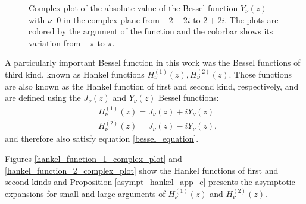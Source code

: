 \begin{figure}[!htb]
\begin{minipage}{.5\textwidth}
        \captionsetup{width=0.9\linewidth} %
        \caption{Complex plot of the absolute value of the Bessel function \(Y_\nu(z)\) with \(\nu_=0\) in the complex plane from \(-2-2i\) to \(2+2i\). The plots are colored by the argument of the function and the colorbar shows its variation from \(-\pi\) to \(\pi\).}
        \label{bessel_function_y_complex_plot}
    \end{minipage}
\end{figure}

A particularly important Bessel function in this work was the Bessel functions of third kind, known as Hankel functions \(H_\nu^{(1)}(z), H_\nu^{(2)}(z)\). Those functions are also known as the Hankel function of first and second kind, respectively, and are defined using the \(J_\nu(z)\) and \(Y_\nu(z)\) Bessel functions:
\begin{align*}
    &H_\nu^{(1)}(z) = J_\nu(z) + i Y_\nu(z)\\
    &H_\nu^{(2)}(z) = J_\nu(z) - i Y_\nu(z),
\end{align*}
and therefore also satisfy equation \eqref{bessel_equation}.

Figures \ref{hankel_function_1_complex_plot} and \ref{hankel_function_2_complex_plot} show the Hankel functions of first and second kinds and Proposition \ref{asympt_hankel_app_c} presents the asymptotic expansions for small and large arguments of \(H_\nu^{(1)}(z)\) and \(H_\nu^{(2)}(z)\).

